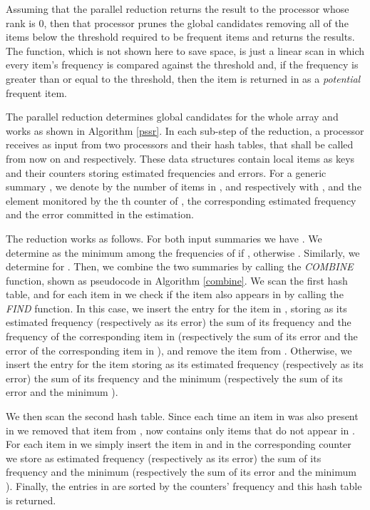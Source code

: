 \documentclass[final,3p,times]{elsarticle}
\begin{document}
Assuming that the parallel reduction returns the result to the processor whose rank is 0, then that processor prunes the global candidates removing all of the items below the threshold required to be frequent items and returns the results. The  function, which is not shown here to save space, is just a linear scan in which every item's frequency is compared against the threshold and, if the frequency is greater than or equal to the threshold, then the item is returned in  as a \emph{potential} frequent item.

The parallel reduction determines global candidates for the whole array and works as shown in Algorithm \ref{pssr}. In each sub-step of the reduction, a processor receives as input from two processors   and  their  hash tables, that shall be called from now on   and  respectively. These data structures contain local items as keys and their counters storing estimated frequencies and errors. For a generic summary , we denote by  the number of  items in , and respectively with ,   and  the element monitored by the th counter of , the corresponding estimated frequency and the error committed in the estimation. 

The reduction works as follows. For both input summaries  we have .  We determine  as the minimum among the frequencies of  if , otherwise . Similarly, we determine  for .
Then, we combine the two summaries by calling the \textit{COMBINE} function, shown as pseudocode in Algorithm \ref{combine}. We scan the first hash table, and for each item in  we check if the item also appears in  by calling the \textit{FIND} function. In this case, we insert the entry for the item in , storing as its estimated frequency (respectively as its error) the sum of its frequency and the frequency of the corresponding item in  (respectively the sum of its error and the error of the corresponding item in ), and remove the item from . Otherwise, we insert the entry for the item storing as its estimated frequency (respectively as its error) the sum of its frequency and the minimum  (respectively the sum of its error and the minimum ). 

We then scan the second hash table. Since each time an item in  was also present in  we removed that item from , now  contains only items that do not appear in . For each item in  we simply insert the item in  and in the corresponding counter we store as estimated frequency (respectively as its error) the sum of its frequency and the minimum  (respectively the sum of its error and the minimum ). Finally, the entries in  are sorted by the counters' frequency and this hash table is returned.
\end{document}
